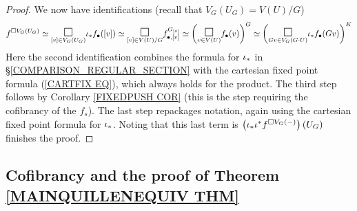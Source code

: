 \documentclass[a4paper,10pt]{article}%
\begin{document}
\begin{proof}
We now have identifications
(recall that $V_G(U_G) = V(U)/G$)
\begin{align*}
	f^{\square V_G(U_G)}
\simeq
	\underset{[v] \in V_G(U_G)}{\mathlarger{\mathlarger{\square}}}
	\iota_{\**}f_{\bullet}([v])
\simeq
	\underset{[v] \in V(U)/G}{\mathlarger{\mathlarger{\square}}}
	f_{\bullet,[v]}^{G_{[v]}}
\simeq
	\left(
	\underset{v \in V(U)}{\mathlarger{\mathlarger{\square}}}
	f_{\bullet}(v)
	\right)^G
\simeq
	\left(
	\underset{G v \in V_G(G \cdot U)}{\mathlarger{\mathlarger{\square}}}
	\iota_{\**} f_{\bullet}(G v)
	\right)^K
\end{align*}
Here the second identification combines the formula for $\iota_{\**}$ in 
\S \ref{COMPARISON_REGULAR_SECTION}
with the cartesian fixed point formula (\ref{CARTFIX EQ}), which always holds for the product.
The third step follows by 
Corollary \ref{FIXEDPUSH COR} 
(this is the step requiring the cofibrancy of the $f_s$).
The last step repackages notation, again using the cartesian fixed point formula for $\iota_{\**}$.
Noting that this last term is
$ \left(\iota_{\**} \iota^{\**} f^{\square V_G(-)}
\right) (U_G)$ finishes the proof.
\end{proof}



\subsection{Cofibrancy and the proof of Theorem \ref{MAINQUILLENEQUIV THM}}
\label{MAINTHM_PROOF_SECTION}
\end{document}

